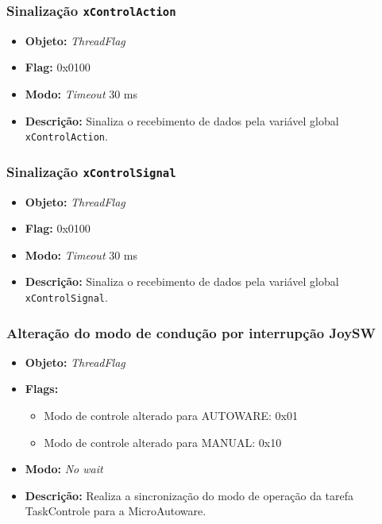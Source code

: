 \subsubsection*{Sinalização \texttt{xControlAction}}
	
	\begin{itemize}
		\item \textbf{Objeto:} \textit{ThreadFlag}
		\item \textbf{Flag:} 0x0100
		\item \textbf{Modo:} \textit{Timeout} 30 ms
		\item \textbf{Descrição:} Sinaliza o recebimento de dados pela variável global \texttt{xControlAction}.
		
	\end{itemize}	

\subsubsection*{Sinalização \texttt{xControlSignal}}
	
	\begin{itemize}
		\item \textbf{Objeto:} \textit{ThreadFlag}
		\item \textbf{Flag:} 0x0100
		\item \textbf{Modo:} \textit{Timeout} 30 ms
		\item \textbf{Descrição:} Sinaliza o recebimento de dados pela variável global \texttt{xControlSignal}.
		
	\end{itemize}	



\subsubsection*{Alteração do modo de condução por interrupção JoySW}
	
	\begin{itemize}
		\item \textbf{Objeto:} \textit{ThreadFlag}
		\item \textbf{Flags:}
		\begin{itemize}
			\item Modo de controle alterado para AUTOWARE: 0x01
			\item Modo de controle alterado para MANUAL: 0x10
			
		\end{itemize}
		\item \textbf{Modo:} \textit{No wait}
		\item \textbf{Descrição:} Realiza a sincronização do modo de operação da tarefa TaskControle para a MicroAutoware.
		
	\end{itemize}

